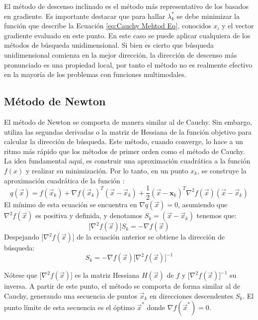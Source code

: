 El método de descenso inclinado es el método más representativo de los basados en gradiente. Es importante destacar que para hallar $\lambda^*_k$ se debe minimizar la función que describe la Ecuación \ref{eq:Cauchy Mehtod Eq}, conocidos $x_i$ y el vector gradiente evaluado en este punto. En este caso se puede aplicar cualquiera de los métodos de búsqueda unidimensional. Si bien es cierto que búsqueda unidimensional comienza en la mejor dirección, la dirección de descenso más pronunciado es una propiedad local, por tanto el método no es realmente efectivo en la mayoría de los problemas con funciones multimodales.
\subsection{Método de Newton}
El método de Newton se comporta de manera similar al de Cauchy. Sin embargo, utiliza las segundas derivadas o la matriz de Hessiana de la función objetivo para calcular la dirección de búsqueda. Este método, cuando converge, lo hace a un ritmo más rápido que los métodos de primer orden como el método de Cauchy. La idea fundamental aquí, es construir una aproximación cuadrática a la función $f (x)$ y realizar su minimización. Por lo tanto, en un punto $x_k$, se construye la aproximación cuadrática de la función \cite{belegundu_optimization_2011}:
\begin{equation}\label{eq:Newton Method cuatric aprox}
q(\vec{x})= f(\vec{x}_k) +\nabla f(\vec{x}_k)^T (\vec{x}-\vec{x}_k) +\frac{1}{2} (\vec{x}-\textbf{x}_k)^T \nabla^2 f(\vec{x}) (\vec{x}-\vec{x}_k)
\end{equation}
El mínimo de esta ecuación se encuentra en $ \nabla q(\vec{x})=0$, asumiendo que  $\nabla^2 f(\vec{x})$ es positiva y definida, y denotamos $S_k=(\vec{x}-\vec{x}_k)$  tenemos que:
\begin{equation}\label{eq:Newton Method eq}
  \big[ \nabla^2 f(\vec{x}) \big ] S_k=- \nabla f(\vec{x}) 
\end{equation}
Despejando  $\big[ \nabla^2 f(\vec{x}) \big ]$ de la ecuación anterior se obtiene la dirección de búsqueda:
\begin{equation}
S_k=- \nabla f(\vec{x})   \big[ \nabla^2 f(\vec{x}) \big ]^{-1}
\end{equation}

Nótese que $ \big[ \nabla^2 f(\vec{x}) \big ]$  es la matriz Hessiana $H(\vec{x})$ de $f$ y $\big[ \nabla^2 f(\vec{x}) \big ]^{-1}$ su inversa. A partir de este punto, el método se comporta de forma similar al de Cauchy, generando una secuencia de puntos $\vec{x}_k$ en direcciones descendentes $S_k$. El punto límite de esta secuencia es el óptimo $\vec{x}^*$ donde $\nabla f(\vec{x}^*) = 0$. 

